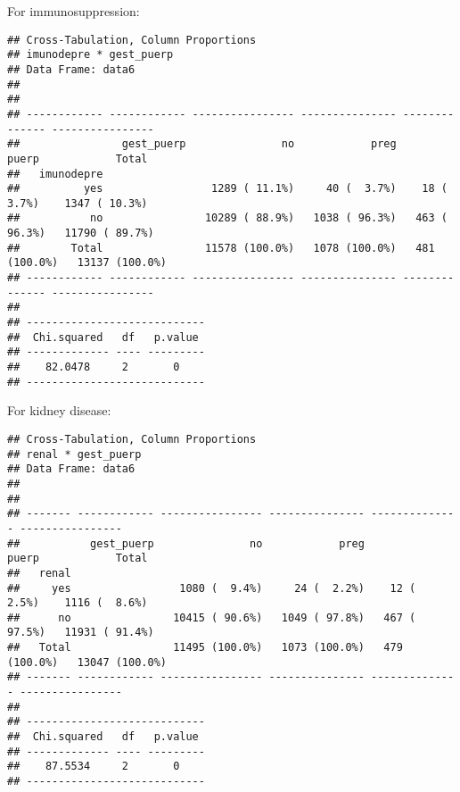 \documentclass[
]{article}
\newenvironment{Shaded}{\begin{snugshade}}{\end{snugshade}}
\newcommand{\DataTypeTok}[1]{\textcolor[rgb]{0.13,0.29,0.53}{#1}}
\newcommand{\KeywordTok}[1]{\textcolor[rgb]{0.13,0.29,0.53}{\textbf{#1}}}
\newcommand{\NormalTok}[1]{#1}
\newcommand{\OperatorTok}[1]{\textcolor[rgb]{0.81,0.36,0.00}{\textbf{#1}}}
\newcommand{\OtherTok}[1]{\textcolor[rgb]{0.56,0.35,0.01}{#1}}
\newcommand{\StringTok}[1]{\textcolor[rgb]{0.31,0.60,0.02}{#1}}
\begin{document}
For immunosuppression:

\begin{Shaded}
\end{Shaded}

\begin{verbatim}
## Cross-Tabulation, Column Proportions  
## imunodepre * gest_puerp  
## Data Frame: data6  
## 
## 
## ------------ ------------ ---------------- --------------- -------------- ----------------
##                gest_puerp               no            preg          puerp            Total
##   imunodepre                                                                              
##          yes                 1289 ( 11.1%)     40 (  3.7%)    18 (  3.7%)    1347 ( 10.3%)
##           no                10289 ( 88.9%)   1038 ( 96.3%)   463 ( 96.3%)   11790 ( 89.7%)
##        Total                11578 (100.0%)   1078 (100.0%)   481 (100.0%)   13137 (100.0%)
## ------------ ------------ ---------------- --------------- -------------- ----------------
## 
## ----------------------------
##  Chi.squared   df   p.value 
## ------------- ---- ---------
##    82.0478     2       0    
## ----------------------------
\end{verbatim}

For kidney disease:

\begin{Shaded}
\end{Shaded}

\begin{verbatim}
## Cross-Tabulation, Column Proportions  
## renal * gest_puerp  
## Data Frame: data6  
## 
## 
## ------- ------------ ---------------- --------------- -------------- ----------------
##           gest_puerp               no            preg          puerp            Total
##   renal                                                                              
##     yes                 1080 (  9.4%)     24 (  2.2%)    12 (  2.5%)    1116 (  8.6%)
##      no                10415 ( 90.6%)   1049 ( 97.8%)   467 ( 97.5%)   11931 ( 91.4%)
##   Total                11495 (100.0%)   1073 (100.0%)   479 (100.0%)   13047 (100.0%)
## ------- ------------ ---------------- --------------- -------------- ----------------
## 
## ----------------------------
##  Chi.squared   df   p.value 
## ------------- ---- ---------
##    87.5534     2       0    
## ----------------------------
\end{verbatim}
\end{document}
